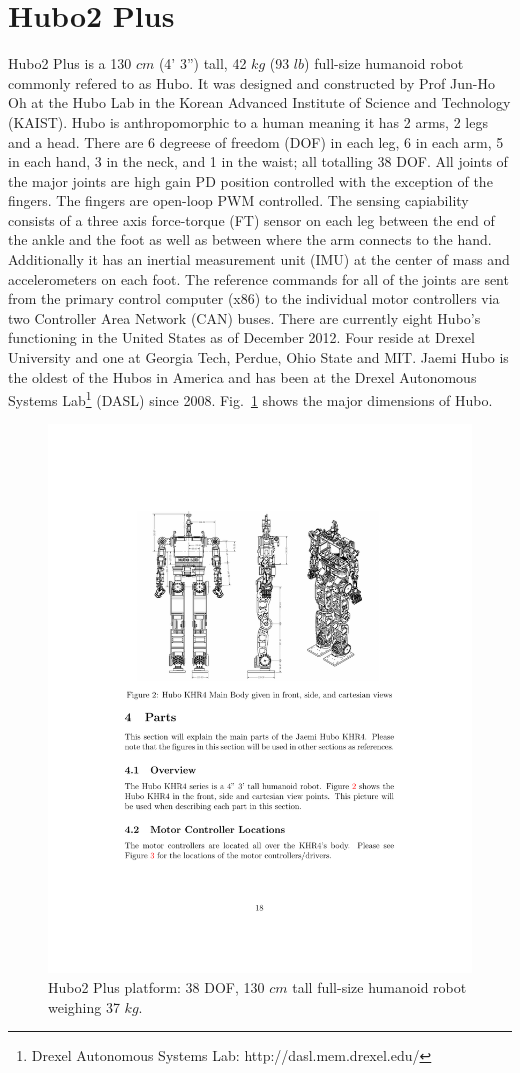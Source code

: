 \section{Hubo2 Plus}
Hubo2 Plus is a 130 $cm$ (4' 3'') tall, 42 $kg$ (93 $lb$) full-size humanoid robot commonly refered to as Hubo.  
It was designed and constructed by Prof Jun-Ho Oh at the Hubo Lab in the Korean Advanced Institute of Science and Technology (KAIST)\cite{hubo-first}.
Hubo is anthropomorphic to a human meaning it has 2 arms, 2 legs and a head.
There are 6 degreese of freedom (DOF) in each leg, 6 in each arm, 5 in each hand, 3 in the neck, and 1 in the waist; all totalling 38 DOF.
All joints of the major joints are high gain PD position controlled with the exception of the fingers.
The fingers are open-loop PWM controlled.
The sensing capiability consists of a three axis force-torque (FT) sensor on each leg between the end of the ankle and the foot as well as between where the arm connects to the hand.
Additionally it has an inertial measurement unit (IMU) at the center of mass and accelerometers on each foot.
The reference commands for all of the joints are sent from the primary control computer (x86) to the individual motor controllers via two Controller Area Network (CAN) buses.
There are currently eight Hubo's functioning in the United States as of December 2012.
Four reside at Drexel University and one at Georgia Tech, Perdue, Ohio State and MIT.
Jaemi Hubo is the oldest of the Hubos in America and has been at the Drexel Autonomous Systems Lab\footnote{Drexel Autonomous Systems Lab: http://dasl.mem.drexel.edu/} (DASL) since 2008\cite{jaemiHuboSRM}.
Fig.~\ref{fig:hubo} shows the major dimensions of Hubo.

\begin{figure}[thpb]
  \centering
\includegraphics[width=1.0\columnwidth]{./pix/huboSkel.pdf}
  \caption{Hubo2 Plus platform: 38 DOF, 130 $cm$ tall full-size humanoid robot weighing 37 $kg$.}
  \label{fig:hubo}
\end{figure}



